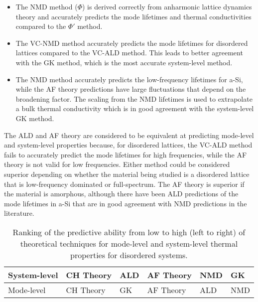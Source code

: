 \begin{itemize}
\item The NMD method ($\Phi$) is derived correctly from anharmonic lattice 
dynamics theory and accurately predicts the mode 
lifetimes and thermal conductivities compared to the $\Phi'$ method.
\item The VC-NMD method accurately predicts the mode lifetimes for 
disordered lattices compared to the VC-ALD method. This leads to better 
agreement with the GK method, which is the most accurate system-level 
method.
\item The NMD method accurately predicts the low-frequency lifetimes 
for a-Si, while the AF theory predictions have large fluctuations that  
depend on the broadening factor. The scaling from the NMD lifetimes is 
used to extrapolate a bulk thermal conductivity which is in good 
agreement with the system-level GK method. 
\end{itemize}

The ALD and AF theory are considered to be equivalent at predicting 
mode-level and system-level properties because, for disordered lattices, 
the VC-ALD method fails to accurately 
predict the mode lifetimes for high frequencies, 
while the AF theory is not valid for low frequencies. Either 
method could be considered superior depending on whether the material 
being studied is a disordered lattice that is low-frequency dominated 
or full-spectrum. The AF theory is superior if the material is amorphous, 
although there have been ALD predictions\cite{fabian_anharmonic_1996} 
of the mode lifetimes in a-Si that are in good agreement with 
NMD predictions\cite{bickham_calculation_1998,bickham_numerical_1999} 
in the literature. 

\begin{center}
\begin{table}
\small
\caption{\label{T-comparison-predictive}Ranking of the predictive 
ability from low to high (left to right) of theoretical techniques 
for mode-level and system-level thermal properties for disordered 
systems.}
\begin{tabular}{p{0.9in}|p{0.9in}|p{0.9in}|p{0.9in}|p{0.9in}|p{0.9in}}
\hline\hline
System-level
&CH Theory 
&ALD 
&AF Theory 
&NMD 
&GK \\ 
\hline
Mode-level
&CH Theory 
&GK
&AF Theory
&ALD
&NMD \\ 
\hline\hline
\end{tabular}
\end{table}
\end{center}

